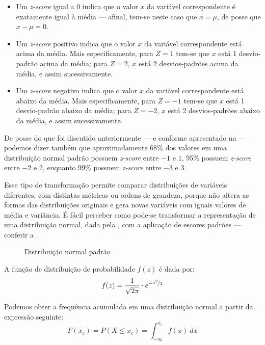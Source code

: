 \begin{itemize}
    \item Um \emph{z-score} igual a 0 indica que o valor $x$ da variável
    correspondente é exatamente igual à média --- afinal, tem-se neste caso que
    $x=\mu$, de posse que $x-\mu = 0$.
    \item Um \emph{z-score} positivo indica que o valor $x$ da variável
    correspondente está acima da média. Mais especificamente, para $Z=1$
    tem-se que $x$ está 1 desvio-padrão acima da média; para $Z=2$, $x$ está 2
    desvios-padrões acima da média, e assim sucessivamente.
    \item Um \emph{z-score} negativo indica que o valor $x$ da variável
    correspondente está abaixo da média. Mais especificamente, para $Z=-1$
    tem-se que $x$ está 1 desvio-padrão abaixo da média; para $Z=-2$, $x$ está
    2 desvios-padrões abaixo da média, e assim sucessivamente.
\end{itemize}

De posse do que foi discutido anteriormente --- e conforme apresentado na
 --- podemos dizer também que aproximadamente 68\% dos
valores em uma distribuição normal padrão possuem \emph{z-score} entre $-1$ e
$1$, 95\% possuem \emph{z-score} entre $-2$ e $2$, enquanto 99\% possuem
\emph{z-score} entre $-3$ e $3$.

Esse tipo de transformação permite comparar distribuições de variáveis
diferentes, com distintas métricas ou ordens de grandeza, porque não altera as
formas das distribuições originais e gera novas variáveis com iguais valores de
média e variância. É fácil perceber como pode-se transformar a representação de
uma distribuição normal, dada pela , com a aplicação de
escores padrões --- conferir a .

\begin{figure}[htpb]
    \centering
    {}
    \caption{Distribuição normal padrão}
    \label{fig:dist_zscore}
\end{figure}

A função de distribuição de probabilidade $f(z)$ é dada por:
\begin{equation}
    f(z) = \frac{1}{\sqrt{2 \pi}} \cdot e^{-\nicefrac{z^2}{2}}
    \label{eq:dist-normal-zscore}
\end{equation}

Podemos obter a frequência acumulada em uma distribuição normal a partir da
expressão seguinte:
\begin{equation}
    F(x_c) = P(X \leq x_c) = \int_{{-\infty}}^{{x_c}} {f(x)} \: d{x} {}
    \label{eq:freq-acumulada-dist-normal}
\end{equation}

